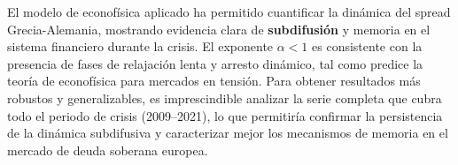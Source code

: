 \documentclass[12pt,a4paper]{article}
\begin{document}
El modelo de econofísica aplicado ha permitido cuantificar la dinámica del spread Grecia-Alemania, mostrando evidencia clara de \textbf{subdifusión} y memoria en el sistema financiero durante la crisis. El exponente $\alpha < 1$ es consistente con la presencia de fases de relajación lenta y arresto dinámico, tal como predice la teoría de econofísica para mercados en tensión. Para obtener resultados más robustos y generalizables, es imprescindible analizar la serie completa que cubra todo el periodo de crisis (2009--2021), lo que permitiría confirmar la persistencia de la dinámica subdifusiva y caracterizar mejor los mecanismos de memoria en el mercado de deuda soberana europea.





%
%
\end{document}
